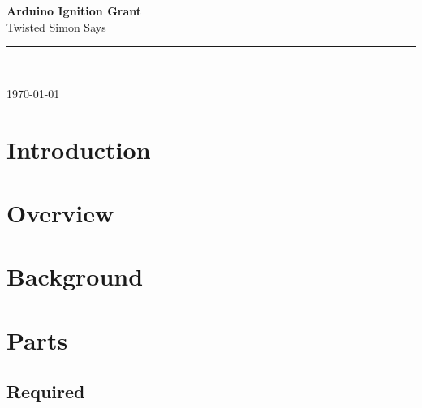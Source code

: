\documentclass[12pt,letterpaper,oneside]{article}
\newcommand{\HRule}{\rule{\linewidth}{0.5mm}}
\begin{document}
\begin{titlepage}
\vspace*{\fill}
\begin{center}
	
{\huge \bfseries Arduino Ignition Grant} \\[0.4cm]
Twisted Simon Says
\HRule \\[0.4cm]

\begin{minipage}{0.4\textwidth}
\end{minipage}

\vspace*{\fill}

{\large \today}
\end{center}
\end{titlepage}

\doublespace
\tableofcontents %
\newpage
\listoftables %
\newpage
\lstlistoflistings %
\newpage
\singlespace
{} %
			
\section{Introduction}

\section{Overview}

\section{Background}

\section{Parts}
		\subsection{Required}
		
\end{document}

